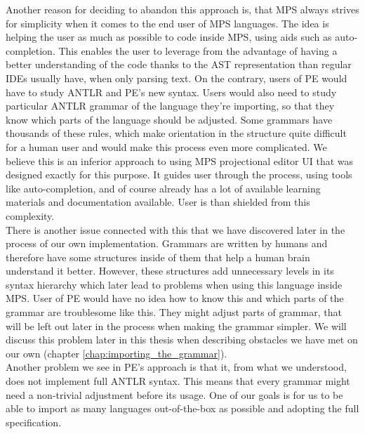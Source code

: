 Another reason for deciding to abandon this approach is, that MPS always strives for simplicity when it comes to the end user of MPS languages.
The idea is helping the user as much as possible to code inside MPS, using aids such as auto-completion.
This enables the user to leverage from the advantage of having a better understanding of the code thanks to the AST representation than regular IDEs usually have, when only parsing text.
On the contrary, users of PE would have to study ANTLR and PE's new syntax.
Users would also need to study particular ANTLR grammar of the language they're importing, so that they know which parts of the language should be adjusted.
Some grammars have thousands of these rules, which make orientation in the structure quite difficult for a human user and would make this process even more complicated.
We believe this is an inferior approach to using MPS projectional editor UI that was designed exactly for this purpose.
It guides user through the process, using tools like auto-completion, and of course already has a lot of available learning materials and documentation available.
User is than shielded from this complexity.
\\

There is another issue connected with this that we have discovered later in the process of our own implementation.
Grammars are written by humans and therefore have some structures inside of them that help a human brain understand it better.
However, these structures add unnecessary levels in its syntax hierarchy which later lead to problems when using this language inside MPS.
User of PE would have no idea how to know this and which parts of the grammar are troublesome like this.
They might adjust parts of grammar, that will be left out later in the process when making the grammar simpler.
We will discuss this problem later in this thesis when describing obstacles we have met on our own (chapter \ref{chap:importing_the_grammar}).
\\

Another problem we see in PE's approach is that it, from what we understood, does not implement full ANTLR syntax.
This means that every grammar might need a non-trivial adjustment before its usage.
One of our goals is for us to be able to import as many languages out-of-the-box as possible and adopting the full specification.
\\

